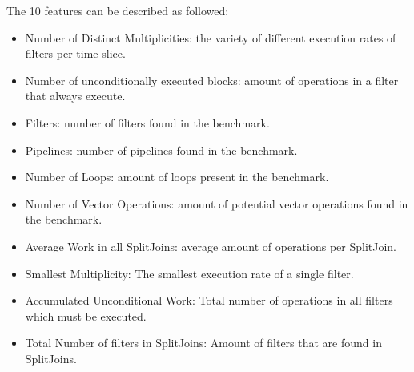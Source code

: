The 10 features can be described as followed:
\begin{itemize}
\item Number of Distinct Multiplicities: the variety of different execution rates of filters per time slice.
\vspace{-1em}
\item Number of unconditionally executed blocks: amount of operations in a filter that always execute.
\vspace{-1em}
\item Filters: number of filters found in the benchmark.
\vspace{-1em}
\item Pipelines: number of pipelines found in the benchmark.
\vspace{-1em}
\item Number of Loops: amount of loops present in the benchmark.
\vspace{-1em}
\item Number of Vector Operations: amount of potential vector operations found in the benchmark.
\vspace{-1em}
\item Average Work in all SplitJoins: average amount of operations per SplitJoin.
\vspace{-1em}
\item Smallest Multiplicity: The smallest execution rate of a single filter.
\vspace{-1em}
\item Accumulated Unconditional Work: Total number of operations in all filters which must be executed.
\vspace{-1em}
\item Total Number of filters in SplitJoins: Amount of filters that are found in SplitJoins.
\end{itemize}

